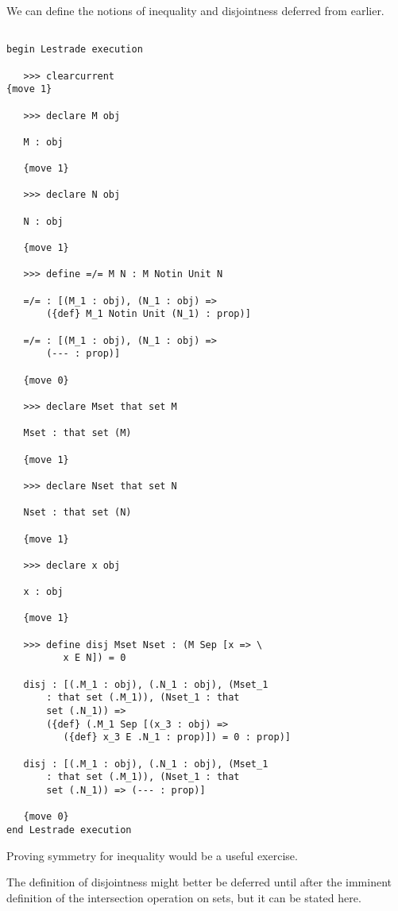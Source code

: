 \documentclass[12pt]{article}
\begin{document}
We can define the notions of inequality and disjointness deferred from earlier.

\begin{verbatim}

begin Lestrade execution

   >>> clearcurrent
{move 1}

   >>> declare M obj

   M : obj

   {move 1}

   >>> declare N obj

   N : obj

   {move 1}

   >>> define =/= M N : M Notin Unit N

   =/= : [(M_1 : obj), (N_1 : obj) => 
       ({def} M_1 Notin Unit (N_1) : prop)]

   =/= : [(M_1 : obj), (N_1 : obj) => 
       (--- : prop)]

   {move 0}

   >>> declare Mset that set M

   Mset : that set (M)

   {move 1}

   >>> declare Nset that set N

   Nset : that set (N)

   {move 1}

   >>> declare x obj

   x : obj

   {move 1}

   >>> define disj Mset Nset : (M Sep [x => \
          x E N]) = 0

   disj : [(.M_1 : obj), (.N_1 : obj), (Mset_1 
       : that set (.M_1)), (Nset_1 : that 
       set (.N_1)) => 
       ({def} (.M_1 Sep [(x_3 : obj) => 
          ({def} x_3 E .N_1 : prop)]) = 0 : prop)]

   disj : [(.M_1 : obj), (.N_1 : obj), (Mset_1 
       : that set (.M_1)), (Nset_1 : that 
       set (.N_1)) => (--- : prop)]

   {move 0}
end Lestrade execution

\end{verbatim}

Proving symmetry for inequality would be a useful exercise.

The definition of disjointness might better be deferred until after the imminent definition of the intersection operation on sets, but it can be stated here.
\end{document}
